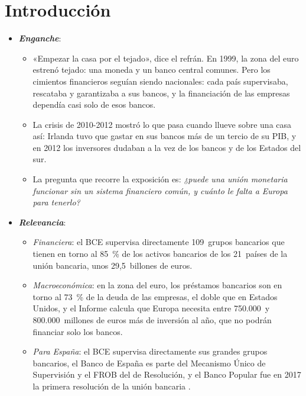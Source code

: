 \documentclass[11pt]{article}
\begin{document}
\tceetitulo

\section*{Introducción}

\begin{itemize}
\item \textbf{\emph{Enganche}}:
  \begin{itemize}
  \item «Empezar la casa por el tejado», dice el refrán. En 1999, la zona del euro estrenó tejado: una moneda y un banco central comunes. Pero los cimientos financieros seguían siendo nacionales: cada país supervisaba, rescataba y garantizaba a sus bancos, y la financiación de las empresas dependía casi solo de esos bancos.
  \item La crisis de 2010-2012 mostró lo que pasa cuando llueve sobre una casa así: Irlanda tuvo que gastar en sus bancos más de un tercio de su PIB, y en 2012 los inversores dudaban a la vez de los bancos y de los Estados del sur\nocite{LaevenValencia2020,BrunnermeierEtAl2016}.
  \item La pregunta que recorre la exposición es: \emph{¿puede una unión monetaria funcionar sin un sistema financiero común, y cuánto le falta a Europa para tenerlo?}
  \end{itemize}

\item \textbf{\emph{Relevancia}}:
  \begin{itemize}
  \item \emph{Financiera}: el BCE supervisa directamente 109~grupos bancarios que tienen en torno al 85~\% de los activos bancarios de los 21~países de la unión bancaria, unos 29,5~billones de euros\nocite{BCE2026ListaEntidades,BCE2026SupervisionSI}.
  \item \emph{Macroeconómica}: en la zona del euro, los préstamos bancarios son en torno al 73~\% de la deuda de las empresas, el doble que en Estados Unidos, y el Informe  calcula que Europa necesita entre 750.000~y 800.000~millones de euros más de inversión al año, que no podrán financiar solo los bancos\nocite{Draghi2024Future}.
  \item \emph{Para España}: el BCE supervisa directamente sus grandes grupos bancarios, el Banco de España es parte del Mecanismo Único de Supervisión y el FROB del de Resolución, y el Banco Popular fue en 2017 la primera resolución de la unión bancaria  .
  \end{itemize}


\end{itemize}
\end{document}
